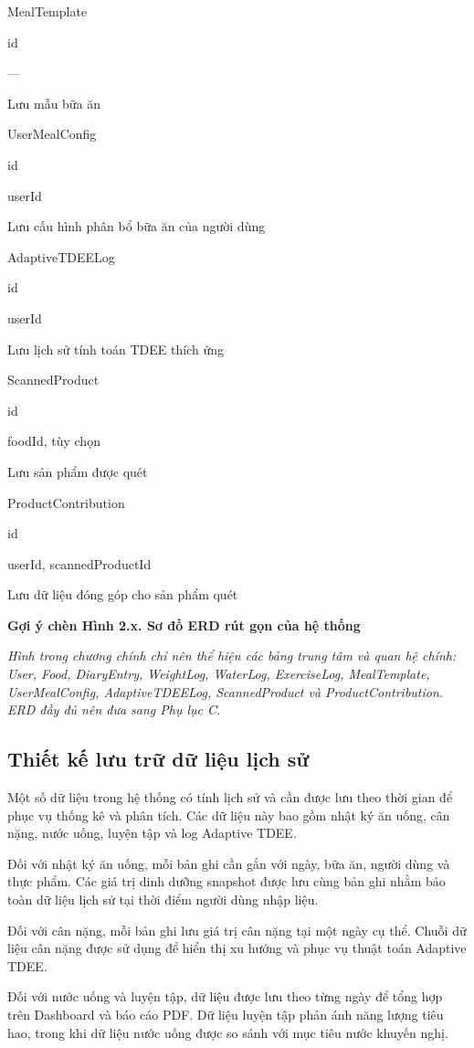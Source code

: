 \documentclass[12pt, a4paper]{report}
\begin{document}
MealTemplate

id

—

Lưu mẫu bữa ăn

UserMealConfig

id

userId

Lưu cấu hình phân bổ bữa ăn của người dùng

AdaptiveTDEELog

id

userId

Lưu lịch sử tính toán TDEE thích ứng

ScannedProduct

id

foodId, tùy chọn

Lưu sản phẩm được quét

ProductContribution

id

userId, scannedProductId

Lưu dữ liệu đóng góp cho sản phẩm quét

\textbf{Gợi ý chèn Hình 2.x. Sơ đồ ERD rút gọn của hệ thống}

\textit{Hình trong chương chính chỉ nên thể hiện các bảng trung tâm và quan hệ chính: User, Food, DiaryEntry, WeightLog, WaterLog, ExerciseLog, MealTemplate, UserMealConfig, AdaptiveTDEELog, ScannedProduct và ProductContribution. ERD đầy đủ nên đưa sang Phụ lục C.}

\subsection{Thiết kế lưu trữ dữ liệu lịch sử}Một số dữ liệu trong hệ thống có tính lịch sử và cần được lưu theo thời gian để phục vụ thống kê và phân tích. Các dữ liệu này bao gồm nhật ký ăn uống, cân nặng, nước uống, luyện tập và log Adaptive TDEE.

Đối với nhật ký ăn uống, mỗi bản ghi cần gắn với ngày, bữa ăn, người dùng và thực phẩm. Các giá trị dinh dưỡng snapshot được lưu cùng bản ghi nhằm bảo toàn dữ liệu lịch sử tại thời điểm người dùng nhập liệu.

Đối với cân nặng, mỗi bản ghi lưu giá trị cân nặng tại một ngày cụ thể. Chuỗi dữ liệu cân nặng được sử dụng để hiển thị xu hướng và phục vụ thuật toán Adaptive TDEE.

Đối với nước uống và luyện tập, dữ liệu được lưu theo từng ngày để tổng hợp trên Dashboard và báo cáo PDF. Dữ liệu luyện tập phản ánh năng lượng tiêu hao, trong khi dữ liệu nước uống được so sánh với mục tiêu nước khuyến nghị.
\end{document}
